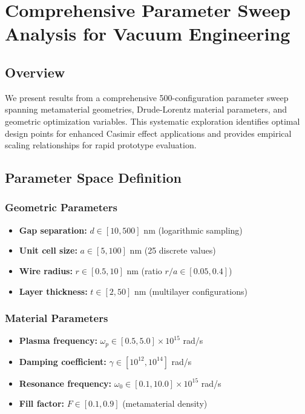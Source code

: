 \documentclass[11pt]{article}
\begin{document}
\section*{Comprehensive Parameter Sweep Analysis for Vacuum Engineering}

\subsection*{Overview}
We present results from a comprehensive 500-configuration parameter sweep spanning metamaterial geometries, Drude-Lorentz material parameters, and geometric optimization variables. This systematic exploration identifies optimal design points for enhanced Casimir effect applications and provides empirical scaling relationships for rapid prototype evaluation.

\subsection*{Parameter Space Definition}
\subsubsection*{Geometric Parameters}
\begin{itemize}
  \item \textbf{Gap separation:} $d \in [10, 500]$ nm (logarithmic sampling)
  \item \textbf{Unit cell size:} $a \in [5, 100]$ nm (25 discrete values)
  \item \textbf{Wire radius:} $r \in [0.5, 10]$ nm (ratio $r/a \in [0.05, 0.4]$)
  \item \textbf{Layer thickness:} $t \in [2, 50]$ nm (multilayer configurations)
\end{itemize}

\subsubsection*{Material Parameters}
\begin{itemize}
  \item \textbf{Plasma frequency:} $\omega_p \in [0.5, 5.0] \times 10^{15}$ rad/s
  \item \textbf{Damping coefficient:} $\gamma \in [10^{12}, 10^{14}]$ rad/s
  \item \textbf{Resonance frequency:} $\omega_0 \in [0.1, 10.0] \times 10^{15}$ rad/s
  \item \textbf{Fill factor:} $F \in [0.1, 0.9]$ (metamaterial density)
\end{itemize}
\end{document}
